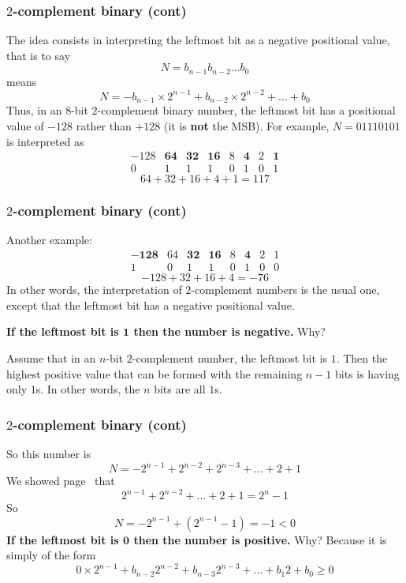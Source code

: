 % 
\begin{frame}
\frametitle{\(2\)-complement binary (cont)}

The idea consists in interpreting the leftmost bit as a negative
positional value, that is to say
\[
N = b_{n-1}b_{n-2}\dots{b_0}
\]
means
\[
N = -b_{n-1} \times 2^{n-1} + b_{n-2} \times 2^{n-2} + \dots + b_0
\]
Thus, in an \(8\)-bit \(2\)-complement binary number, the leftmost bit
has a positional value of \(-128\) rather than \(+128\) (it is
\textbf{not} the MSB). For example, \(N = 01110101\) is interpreted as
\[
\begin{array}{rrrrrrrr}
-128 & \mathbf{64} & \mathbf{32} & \mathbf{16} & 8 & \mathbf{4} & 2 &
\mathbf{1}\\
\hline
  0 &  1 &  1 &  1 & 0 & 1 & 0 & 1
\end{array}
\]
\[
64 + 32 + 16 + 4 + 1 = 117
\]

\end{frame}

% 
\begin{frame}
\frametitle{\(2\)-complement binary (cont)}

Another example:
\[
\begin{array}{rrrrrrrr}
\mathbf{-128} & 64 & \mathbf{32} & \mathbf{16} & 8 & \mathbf{4} & 2 & 1\\
\hline
  1 &  0 &  1 &  1 & 0 & 1 & 0 & 0
\end{array}
\]
\[
-128 + 32 + 16 + 4 = -76
\]
In other words, the interpretation of \(2\)-complement numbers is the
usual one, except that the leftmost bit has a negative positional
value.

\bigskip

\textbf{If the leftmost bit is \(\mathbf{1}\) then the number is
  negative.} Why?

\bigskip

Assume that in an \(n\)-bit \(2\)-complement
number, the leftmost bit is \(1\). Then the highest positive value
that can be formed with the remaining \(n-1\) bits is having only
\(1\)s. In other words, the \(n\) bits are all \(1\)s.

\end{frame}

% 
\begin{frame}
\frametitle{\(2\)-complement binary (cont)}

So this number is
\[
N = -2^{n-1} + 2^{n-2} + 2^{n-3} + \dots + 2 + 1
\]
We showed page~\pageref{max_bin} that
\[
2^{n-1} + 2^{n-2} + \dots + 2 + 1 = 2^n - 1
\]
So
\[
N = -2^{n-1} + (2^{n-1} - 1) = -1 < 0
\]
\textbf{If the leftmost bit is \(\mathbf{0}\) then the number is
  positive.}  Why? Because it is simply of the form
\[
0 \times 2^{n-1} + b_{n-2} 2^{n-2} + b_{n-3} 2^{n-3} + \dots + b_1 2 +
b_0 \geqslant 0
\]

\end{frame}

